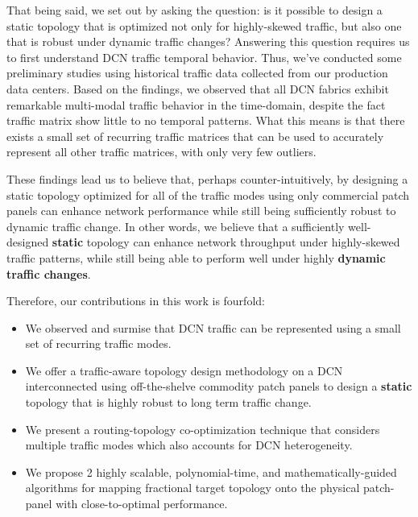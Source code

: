 \documentclass[sigconf]{acmart}
\theoremstyle{definition}
\begin{document}
That being said, we set out by asking the question: is it possible to design a static topology that is optimized not only for highly-skewed traffic, but also one that is robust under dynamic traffic changes? Answering this question requires us to first understand DCN traffic temporal behavior. Thus, we've conducted some preliminary studies using historical traffic data collected from our production data centers. Based on the findings, we observed that all DCN fabrics exhibit remarkable multi-modal traffic behavior in the time-domain, despite the fact traffic matrix show little to no temporal patterns. What this means is that there exists a small set of recurring traffic matrices that can be used to accurately represent all other traffic matrices, with only very few outliers. 

These findings lead us to believe that, perhaps counter-intuitively, by designing a static topology optimized for all of the traffic modes using only commercial patch panels can enhance network performance while still being sufficiently robust to dynamic traffic change. In other words, we believe that a sufficiently well-designed \textbf{static} topology can enhance network throughput under highly-skewed traffic patterns, while still being able to perform well under highly \textbf{dynamic traffic changes}.  

Therefore, our contributions in this work is fourfold:
\begin{itemize}
    \item We observed and surmise that DCN traffic can be represented using a small set of recurring traffic modes.
    \item We offer a traffic-aware topology design methodology on a DCN interconnected using off-the-shelve commodity patch panels to design a \textbf{static} topology that is highly robust to long term traffic change.
    \item We present a routing-topology co-optimization technique that considers multiple traffic modes which also accounts for DCN heterogeneity.
    \item We propose 2 highly scalable, polynomial-time, and mathematically-guided algorithms for mapping fractional target topology onto the physical patch-panel with close-to-optimal performance.
\end{itemize}
\end{document}

